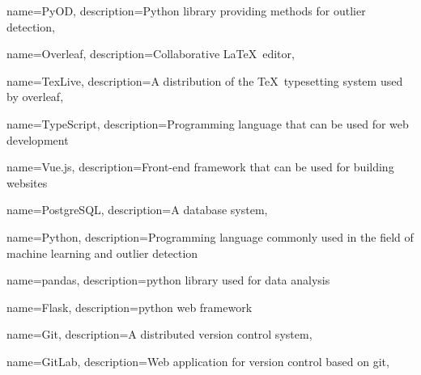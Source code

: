 
{
    name={PyOD},
    description={Python library providing methods for outlier detection},
}

{
    name={Overleaf},
    description={Collaborative \LaTeX\ editor},
}

{
    name={TexLive},
    description={A distribution of the \TeX\ typesetting system used by \gls*{overleaf}},
}

{
    name={TypeScript},
    description={Programming language that can be used for web development}
}

{
    name={Vue.js},
    description={Front-end framework that can be used for building websites}
}

{
    name={PostgreSQL},
    description={A database system},
}

{
    name={Python},
    description={Programming language commonly used in the field of machine learning and outlier detection}
}

{
    name={pandas},
    description={\Gls*{python} library used for data analysis}
}

{
    name={Flask},
    description={\Gls*{python} web framework}
}

{
    name={Git},
    description={A distributed version control system},
}

{
    name={GitLab},
    description={Web application for version control based on \gls*{git}},
}
